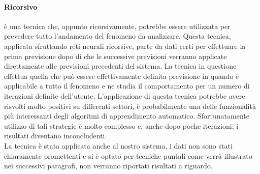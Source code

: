 \documentclass[%
    corpo=12pt,
    twoside,
    oldstyle,
    autoretitolo,
    greek,
    evenboxes,
]{toptesi}
\begin{document}
\paragraph{Ricorsivo} è una tecnica che, appunto ricorsivamente, potrebbe essere utilizzata per prevedere tutto l'andamento del fenomeno da analizzare. Questa tecnica, applicata sfruttando reti neurali ricorsive, parte da dati certi per effettuare la prima previsione dopo di che le successive previsioni verranno applicate direttamente alle previsioni precedenti del sistema. La tecnica in questione effettua quella che può essere effettivamente definita previsione in quando è applicabile a tutto il fenomeno e ne studia il comportamento per un numero di iterazioni definite dell'utente. L'applicazione di questa tecnica potrebbe avere risvolti molto positivi su differenti settori, è probabilmente una delle funzionalità più interessanti degli algoritmi di apprendimento automatico. Sfortunatamente utilizzo di tali strategie è molto complesso e, anche dopo poche iterazioni, i risultati diventano inconcludenti.\\
La tecnica è stata applicata anche al nostro sistema, i dati non sono stati chiaramente promettenti e si è optato per tecniche puntali come verrà illustrato nei successivi paragrafi, non verranno riportati risultati a riguardo.
\end{document}
